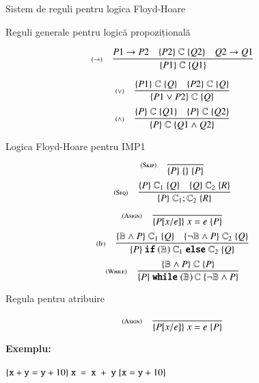 \documentclass[xcolor=pdftex,romanian,colorlinks]{beamer}
\begin{document}
\begin{frame}{Sistem de reguli pentru logica Floyd-Hoare}

\begin{block}{Reguli generale pentru logică propozițională}

\vfill
\[\reg[$\to$]{\{P1\}\;\cmd\;\{Q1\}}{P1\to P2\si \{P2\}\;\cmd \;\{Q2\}\si 
Q2\to Q1}{}\]

\vfill
\[\reg[$\vee$]{\{P1\vee P2\}\; \cmd \;\{Q\}}{\{P1\}\;\cmd \;\{Q\}\si\{P2\}\;\cmd\;\{Q\}}{}\]
\vfill
\[\reg[$\wedge$]{\{P\}\; \cmd \;\{Q1\wedge Q2\}}{\{P\}\;\cmd \;\{Q1\}\si\{P\}\;\cmd\;\{Q2\}}{}\]
\end{block}

\end{frame}
\begin{frame}{Logica Floyd-Hoare pentru IMP1}
\[\reg[Skip]{\{P\}\; \{\} \;\{P\}}{\hspace*{1cm}}{}\]
\vfill
\[\reg[Seq]{\{P\}\;\cmd_1 ; \cmd_2\;\{R\}}{\{P\}\;\cmd_1 \;\{Q\}\si\{Q\}\;\cmd_2\;\{R\}}{}\]
\vfill
\[\reg[Asign]{\{P[x/e]\}\;x = e\;\{P\}}{\hspace*{1cm}}{}\]
\vfill
\[\reg[If]{\{P\}\Sif (\bexp)\  \cmd_1 \Selse \cmd_2\;\{Q\}}{\{\bexp\wedge P\}\;\cmd_1 \;\{Q\}\si\{\neg \bexp\wedge P\}\;\cmd_2\;\{Q\}}{}\]
\vfill
\[\reg[While]{\{P\}\Swhile(\bexp)\,\cmd\;\{\neg \bexp \wedge P\}}{\{\bexp\wedge P\}\;\cmd \;\{P\}}{}\]
\end{frame}

\begin{frame}{Regula pentru atribuire}

\[\reg[Asign]{\{P[x/e]\}\;x = e\;\{P\}}{\hspace*{1cm}}{}\]

\textbf{\color{True} Exemplu:}

$\{\texttt{x}+\te{y} = \te{y}+10\}\ \mbox{\texttt{x = x + y}}\ \{\texttt{x} =\te{y}+10\}$ 

\end{frame}
\end{document}
